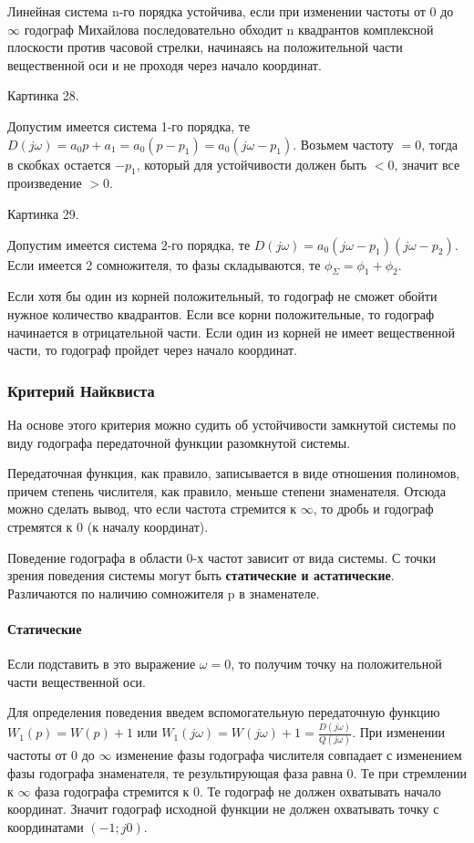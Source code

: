 Линейная система n-го порядка устойчива, если при изменении частоты от 0 до $\infty$ годограф Михайлова последовательно обходит n квадрантов комплексной плоскости против часовой стрелки, начинаясь на положительной части вещественной оси и не проходя через начало координат.

Картинка 28.

Допустим имеется система 1-го порядка, те $D(j\omega)=a_0p+a_1=a_0(p-p_1)=a_0(j\omega-p_1)$. Возьмем частоту $=0$, тогда в скобках остается $-p_1$, который для устойчивости должен быть $<0$, значит все произведение $>0$.

Картинка 29.

Допустим имеется система 2-го порядка, те $D(j\omega)=a_0(j\omega-p_1)(j\omega-p_2)$. Если имеется 2 сомножителя, то фазы складываются, те $\phi_{\Sigma}=\phi_1+\phi_2$.

Если хотя бы один из корней положительный, то годограф не сможет обойти нужное количество квадрантов. Если все корни положительные, то годограф начинается в отрицательной части. Если один из корней не имеет вещественной части, то годограф пройдет через начало координат.

\subsubsection{Критерий Найквиста}
На основе этого критерия можно судить об устойчивости замкнутой системы по виду годографа передаточной функции разомкнутой системы.

Передаточная функция, как правило, записывается в виде отношения полиномов, причем степень числителя, как правило, меньше степени знаменателя. Отсюда можно сделать вывод, что если частота стремится к $\infty$, то дробь и годограф стремятся к 0 (к началу координат).

Поведение годографа в области 0-х частот зависит от вида системы. С точки зрения поведения системы могут быть \textbf{статические и астатические}. Различаются по наличию сомножителя p в знаменателе.

\paragraph{Статические}
Если подставить в это выражение $\omega=0$, то получим точку на положительной части вещественной оси. 

Для определения поведения введем вспомогательную передаточную функцию $W_1(p)=W(p)+1$ или $W_1(j\omega)=W(j\omega)+1=\frac{D(j\omega)}{Q(j\omega)}$. При изменении частоты от 0 до $\infty$ изменение фазы годографа числителя совпадает с изменением фазы годографа знаменателя, те результирующая фаза равна 0. Те при стремлении к $\infty$ фаза годографа стремится к 0. Те годограф не должен охватывать начало координат. Значит годограф исходной функции не должен охватывать точку с координатами $(-1;j0)$.


